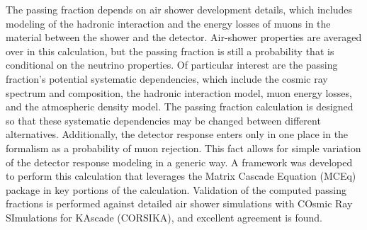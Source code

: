 The passing fraction depends on air shower development details, which includes modeling of the hadronic interaction and the energy losses of muons in the material between the shower and the detector. 
Air-shower properties are averaged over in this calculation, but the passing fraction is still a probability that is conditional on the neutrino properties.
Of particular interest are the passing fraction's potential systematic dependencies, which include the cosmic ray spectrum and composition, the hadronic interaction model, muon energy losses, and the atmospheric density model.
The passing fraction calculation is designed so that these systematic dependencies may be changed between different alternatives.
Additionally, the detector response enters only in one place in the formalism as a probability of muon rejection.
This fact allows for simple variation of the detector response modeling in a generic way.
A framework was developed to perform this calculation that leverages the Matrix Cascade Equation (MCEq) package in key portions of the calculation.
Validation of the computed passing fractions is performed against detailed air shower simulations with COsmic Ray SImulations for KAscade (CORSIKA), and excellent agreement is found.

